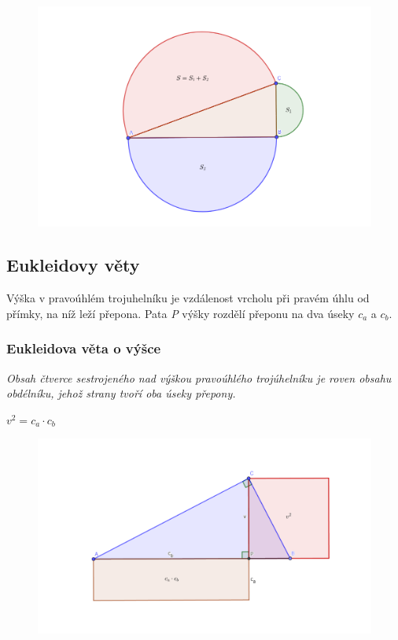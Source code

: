 \documentclass[12pt, a4paper]{article}
\begin{document}
\begin{figure}[H]
\centering
\includegraphics[scale=0.3]{pv1}
\end{figure}

\subsection*{Eukleidovy věty}
Výška v pravoúhlém trojuhelníku je vzdálenost vrcholu při pravém úhlu od přímky, na níž leží přepona. Pata \textit{P} výšky rozdělí přeponu na dva úseky $c_a$ a $c_b$.
\subsubsection*{Eukleidova věta o výšce}
\textit{Obsah čtverce sestrojeného nad výškou pravoúhlého trojúhelníku je roven obsahu obdélníku, jehož strany tvoří oba úseky přepony.}\\
\begin{center}
$v^2=c_a \cdot c_b$
\end{center}
\begin{figure}[H]
\centering
\includegraphics[scale=0.3]{evv}
\end{figure}
\end{document}
